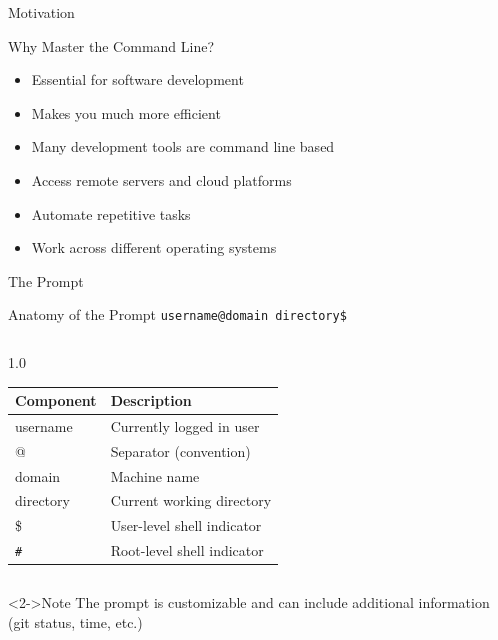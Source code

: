\documentclass[presentation,aspectratio=1610]{beamer}
\begin{document}
\begin{frame}[label={sec:orga5bf6f4}]{Motivation}
\begin{block}{Why Master the Command Line?}
\begin{itemize}[<+->]
\item \alert{Essential} for software development
\item Makes you \alert{much more efficient}
\item Many development tools are command line based
\item Access remote servers and cloud platforms
\item Automate repetitive tasks
\item Work across different operating systems
\end{itemize}
\end{block}
\end{frame}
\begin{frame}[label={sec:orge3a3f17},fragile]{The Prompt}
 \begin{block}{Anatomy of the Prompt}
\texttt{username@domain directory\$}
\end{block}
\begin{columns}
\begin{column}{1.0\columnwidth}
\begin{center}
\begin{tabular}{ll}
Component & Description\\
\hline
username & Currently logged in user\\
@ & Separator (convention)\\
domain & Machine name\\
directory & Current working directory\\
\$ & User-level shell indicator\\
\texttt{\#} & Root-level shell indicator\\
\end{tabular}
\end{center}
\end{column}
\end{columns}
\begin{alertblock}<2->{Note}
The prompt is customizable and can include additional information (git status, time, etc.)
\end{alertblock}
\end{frame}
\end{document}
